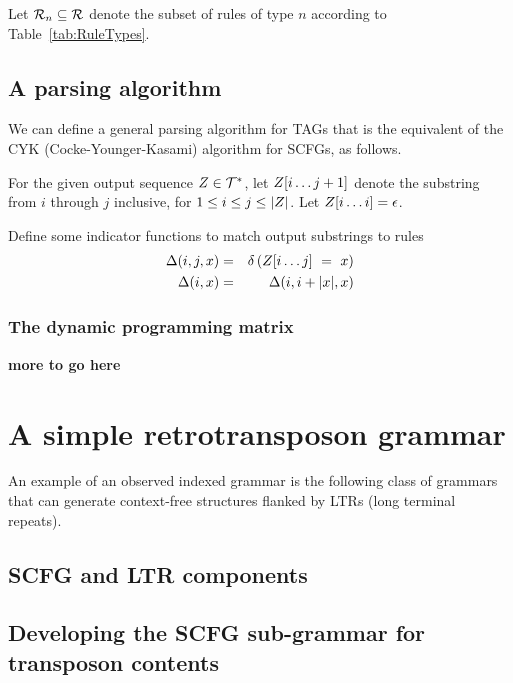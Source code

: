 \documentclass[10pt]{article}
\newcommand{\seclabel}[1]{\label{sec:#1}}
\newcommand{\tabnum}[1]{\ref{tab:#1}}
\newcommand{\tabref}[1]{Table~\tabnum{#1}}
\begin{document}
\newcommand\rulesubset[1]{\rules_{#1}}

Let $\rulesubset{n} \subseteq \rules$ denote the subset of rules of type $n$ according to \tabref{RuleTypes}.

\subsection{A parsing algorithm}

We can define a general parsing algorithm for TAGs
that is the equivalent of the CYK (Cocke-Younger-Kasami) algorithm for SCFGs, as follows.

For the given output sequence $Z \in {\cal T}^\ast$, let $Z[i \ldots j+1]$ denote the substring from $i$ through $j$ inclusive, for $1 \leq i \leq j \leq |Z|$.
Let $Z[i \ldots i] = \epsilon$.

Define some indicator functions to match output substrings to rules
\begin{eqnarray*}
\Delta(i,j,x) & = & \delta \left( Z[i \ldots j]\ =\ x \right) \\
\Delta(i,x) & = & \Delta(i,i+|x|,x)
\end{eqnarray*}

\subsubsection{The dynamic programming matrix}

\newcommand\m{M}


{\bf more to go here}


\section{A simple retrotransposon grammar}
\seclabel{RetroGrammar}

An example of an observed indexed grammar is the following class of grammars that can generate context-free structures flanked by LTRs (long terminal repeats).

\subsection{SCFG and LTR components}

\subsection{Developing the SCFG sub-grammar for transposon contents}
\end{document}
